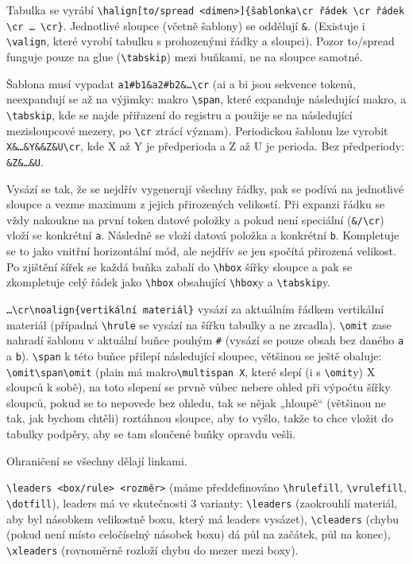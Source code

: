 \documentclass[12pt]{article}					%
\begin{document}
    \begin{definice}[Tabulka]
        Tabulka se vyrábí \verb|\halign[to/spread <dimen>]{šablonka\cr řádek \cr řádek \cr … \cr}|. Jednotlivé sloupce (včetně šablony) se oddělují \verb|&|. (Existuje i \verb|\valign|, které vyrobí tabulku s prohozenými řádky a sloupci). Pozor to/spread funguje pouze na glue (\verb|\tabskip|) mezi buňkami, ne na sloupce samotné.

        Šablona musí vypadat \verb|a1#b1&a2#b2&…\cr| (ai a bi jsou sekvence tokenů, neexpandují se až na výjimky: makro \verb|\span|, které expanduje následující makro, a \verb|\tabskip|, kde se najde přiřazení do registru a použije se na následující mezisloupcové mezery, po \verb|\cr| ztrácí význam). Periodickou šablonu lze vyrobit \verb|X&…&Y&&Z&U\cr|, kde X až Y je předperioda a Z až U je perioda. Bez předperiody: \verb|&Z&…&U|.

        Vysází se tak, že se nejdřív vygenerují všechny řádky, pak se podívá na jednotlivé sloupce a vezme maximum z jejich přirozených velikostí. Při expanzi řádku se vždy nakoukne na první token datové položky a pokud není speciální (\verb|&/\cr|) vloží se konkrétní \verb|a|. Následně se vloží datová položka a konkrétní \verb|b|. Kompletuje se to jako vnitřní horizontální mód, ale nejdřív se jen spočítá přirozená velikost. Po zjištění šířek se každá buňka zabalí do \verb|\hbox| šířky sloupce a pak se zkompletuje celý řádek jako \verb|\hbox| obsahující \verb|\hbox|y a \verb|\tabskip|y.

        \verb|…\cr\noalign{vertikální materiál}| vysází za aktuálním řádkem vertikální materiál (případná \verb|\hrule| se vysází na šířku tabulky a ne zrcadla). \verb|\omit| zase nahradí šablonu v aktuální buňce pouhým \verb|#| (vysází se pouze obsah bez daného \verb|a| a \verb|b|). \verb|\span| k této buňce přilepí následující sloupec, většinou se ještě obaluje: \verb|\omit\span\omit| (plain má makro\verb|\multispan X|, které slepí (i s \verb|\omit|y) X sloupců k sobě), na toto slepení se prvně vůbec nebere ohled při výpočtu šířky sloupců, pokud se to nepovede bez ohledu, tak se nějak „hloupě“ (většinou ne tak, jak bychom chtěli) roztáhnou sloupce, aby to vyšlo, takže to chce vložit do tabulky podpěry, aby se tam sloučené buňky opravdu vešli.

        Ohraničení se všechny dělají linkami.
    \end{definice}

    \begin{definice}[Leaders]
        \verb|\leaders <box/rule> <rozměr>| (máme předdefinováno \verb|\hrulefill|, \verb|\vrulefill|, \verb|\dotfill|), leaders má ve skutečnosti 3 varianty: \verb|\leaders| (zaokrouhlí materiál, aby byl násobkem velikostně boxu, který má leaders vysázet), \verb|\cleaders| (chybu (pokud není místo celočíselný násobek boxu) dá půl na začátek, půl na konec), \verb|\xleaders| (rovnoměrně rozloží chybu do mezer mezi boxy).
    \end{definice}
\end{document}
